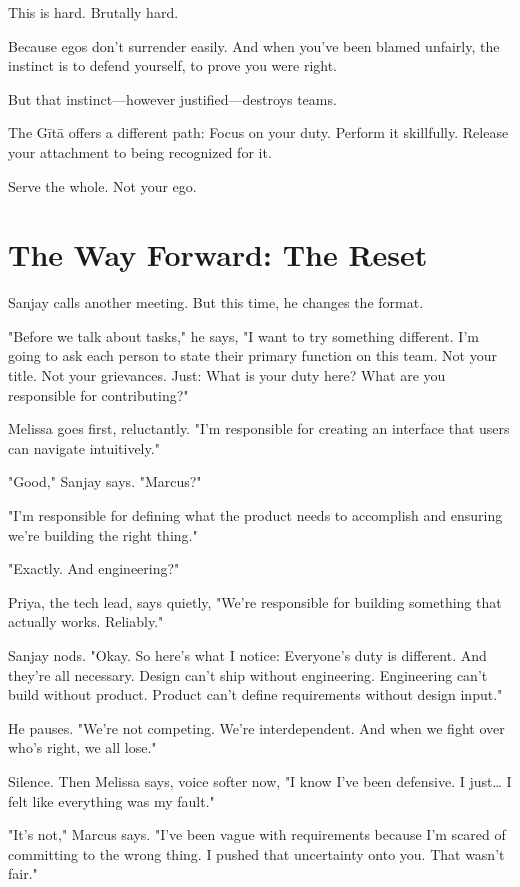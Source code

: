 \documentclass[11pt,twoside]{book}
\begin{document}
This is hard. Brutally hard.

Because egos don't surrender easily. And when you've been blamed unfairly, the instinct is to defend yourself, to prove you were right.

But that instinct—however justified—destroys teams.

The Gītā offers a different path: Focus on your duty. Perform it skillfully. Release your attachment to being recognized for it.

Serve the whole. Not your ego.

\section*{The Way Forward: The Reset}

Sanjay calls another meeting. But this time, he changes the format.

"Before we talk about tasks," he says, "I want to try something different. I'm going to ask each person to state their primary function on this team. Not your title. Not your grievances. Just: What is your duty here? What are you responsible for contributing?"

Melissa goes first, reluctantly. "I'm responsible for creating an interface that users can navigate intuitively."

"Good," Sanjay says. "Marcus?"

"I'm responsible for defining what the product needs to accomplish and ensuring we're building the right thing."

"Exactly. And engineering?"

Priya, the tech lead, says quietly, "We're responsible for building something that actually works. Reliably."

Sanjay nods. "Okay. So here's what I notice: Everyone's duty is different. And they're all necessary. Design can't ship without engineering. Engineering can't build without product. Product can't define requirements without design input."

He pauses. "We're not competing. We're interdependent. And when we fight over who's right, we all lose."

Silence. Then Melissa says, voice softer now, "I know I've been defensive. I just\ldots{} I felt like everything was my fault."

"It's not," Marcus says. "I've been vague with requirements because I'm scared of committing to the wrong thing. I pushed that uncertainty onto you. That wasn't fair."
\end{document}
